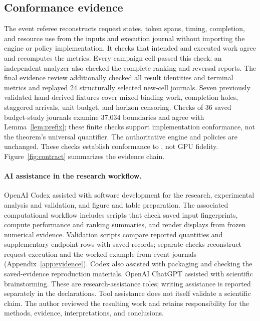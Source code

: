 \subsection{Conformance evidence}
The event referee reconstructs request states, token spans, timing,
completion, and resource use from the inputs and execution journal without
importing the engine or policy implementation. It checks that intended and
executed work agree and recomputes the metrics. Every campaign cell passed
this check; an independent analyzer also checked the complete ranking and
reversal reports. The final evidence review additionally checked all result
identities and terminal metrics and replayed 24 structurally selected new-cell
journals. Seven previously validated hand-derived fixtures cover mixed binding work,
completion holes, staggered arrivals, unit budget, and horizon censoring.
Checks of 36 saved budget-study journals examine 37,034 boundaries and agree
with Lemma~\ref{lem:prefix}; these finite checks support implementation
conformance, not the theorem's universal quantifier. The authoritative
engine and policies are unchanged. These checks establish conformance to
\cm, not GPU fidelity.
Figure~\ref{fig:contract} summarizes the evidence chain.

\paragraph{AI assistance in the research workflow.}\label{sec:research-ai}
OpenAI Codex assisted with software development for the research,
experimental analysis and validation, and figure and table preparation.
The associated computational workflow includes scripts that check saved
input fingerprints, compute performance and ranking summaries, and render
displays from frozen numerical evidence. Validation scripts compare reported
quantities and supplementary endpoint rows with saved records; separate
checks reconstruct request execution and the worked example from event
journals (Appendix~\ref{app:evidence}). Codex also assisted with packaging
and checking the saved-evidence reproduction materials. OpenAI ChatGPT
assisted with scientific brainstorming. These are research-assistance roles;
writing assistance is reported separately in the declarations. Tool
assistance does not itself validate a scientific claim. The author reviewed
the resulting work and retains responsibility for the methods, evidence,
interpretations, and conclusions.

